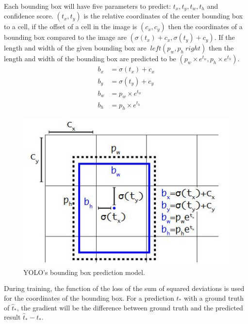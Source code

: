 \documentclass[conference]{IEEEtran}
\begin{document}
Each bounding box will have five parameters to predict: $ t_x, t_y, t_w, t_h $ and confidence score. $ (t_x, t_y) $ is the relative coordinates of the center bounding box to a cell, if the offset of a cell in the image is $ (c_x, c_y) $ then the coordinates of a bounding box compared to the image are $ ( \sigma \left (t_x \right) + c_x, \sigma \left( t_y \right) + c_y) $. If the length and width of the given bounding box are $ \ left (p_w, p_h \ right) $ then the length and width of the bounding box are predicted to be $ \left( p_w \times e ^ {t_w}, p_h \times e ^ {t_h} \right) $.
\begin{align*}
	b_x &= \sigma \left( t_x \right)+c_x\\
	b_y &= \sigma \left( t_y \right)+c_y\\
	b_w &= p_w \times e^{t_w}\\
	b_h &= p_h \times e^{t_h}
\end{align*}
\begin{figure}[ht]
	\centerline{\includegraphics[scale=0.5]{images/bounding_box_prediction.jpg}}
  	\caption{YOLO's bounding box prediction model.}
  	\label{fig:bounding_box_prediction}
\end{figure}
During training, the function of the loss of the sum of squared deviations is used for the coordinates of the bounding box. For a prediction $ t_* $ with a ground truth of $ {\widehat{t}}_* $, the gradient will be the difference between ground truth and the predicted result $ {\widehat{t}}_* - t_* $.
\end{document}
